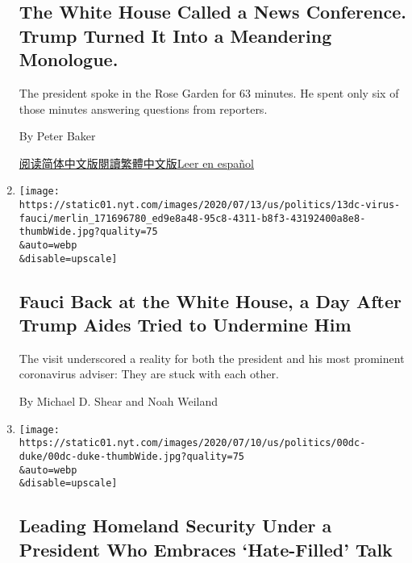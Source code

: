 \begin{enumerate}
{  \subsection{The White House Called a News Conference. Trump Turned It
  Into a Meandering
  Monologue.}\label{the-white-house-called-a-news-conference-trump-turned-it-into-a-meandering-monologue}}

  The president spoke in the Rose Garden for 63 minutes. He spent only
  six of those minutes answering questions from reporters.

  By Peter Baker

  \href{https://cn.nytimes.com/usa/20200715/trump-news-conference/}{阅读简体中文版}\href{https://cn.nytimes.com/usa/20200715/trump-news-conference/zh-hant/}{閱讀繁體中文版}\href{https://www.nytimes.com/es/2020/07/15/espanol/estados-unidos/trump-conferencia-prensa.html}{Leer
  en español}
\item
  \href{/2020/07/13/us/politics/fauci-trump-coronavirus.html}{}

  \texttt{[image: https://static01.nyt.com/images/2020/07/13/us/politics/13dc-virus-fauci/merlin\_171696780\_ed9e8a48-95c8-4311-b8f3-43192400a8e8-thumbWide.jpg?quality=75\\\&auto=webp\\\&disable=upscale]}

  \hypertarget{fauci-back-at-the-white-house-a-day-after-trump-aides-tried-to-undermine-him}{%
  \subsection{Fauci Back at the White House, a Day After Trump Aides
  Tried to Undermine
  Him}\label{fauci-back-at-the-white-house-a-day-after-trump-aides-tried-to-undermine-him}}

  The visit underscored a reality for both the president and his most
  prominent coronavirus adviser: They are stuck with each other.

  By Michael D. Shear and Noah Weiland
\item
  \href{/2020/07/10/us/politics/elaine-duke-homeland-security-trump.html}{}

  \texttt{[image: https://static01.nyt.com/images/2020/07/10/us/politics/00dc-duke/00dc-duke-thumbWide.jpg?quality=75\\\&auto=webp\\\&disable=upscale]}

  \hypertarget{leading-homeland-security-under-a-president-who-embraces-hate-filled-talk}{%
  \subsection{Leading Homeland Security Under a President Who Embraces
  `Hate-Filled'
  Talk}\label{leading-homeland-security-under-a-president-who-embraces-hate-filled-talk}}


\end{enumerate}
